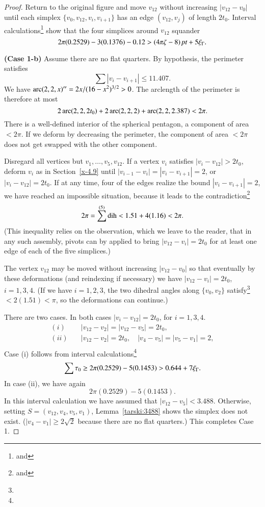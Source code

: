 \begin{proof}
Return to the original figure and move $v_{12}$ without increasing
$|v_{12}-v_0|$ until each simplex $\{v_0,v_{12},v_i,v_{i+1}\}$ has an edge
$(v_{12},v_j)$ of length $2t_0$. Interval
calculations\footnote{ and } show
that the four simplices around $v_{12}$ squander
    $$2\pi(0.2529)-3(0.1376)-0.12 > (4\pi\zeta-8)\,\hbox{\it pt} + 5\xi_\Gamma.$$

{\bf (Case 1-b)} Assume there are no flat quarters. By hypothesis,
the perimeter satisfies $$\sum|v_i-v_{i+1}|\le 11.407.$$ We have
$\operatorname{arc}(2,2,x)'' = 2x/(16-x^2)^{3/2} >0$. The arclength of the
perimeter is therefore at most
$$2\operatorname{arc}(2,2,2t_0) + 2\operatorname{arc}(2,2,2) + \operatorname{arc}(2,2,2.387) <  2\pi.$$
There is a well-defined interior of the spherical pentagon, a
component of area $<2\pi$.  If we deform by decreasing the
perimeter, the component of area $<2\pi$ does not get swapped with
the other component.

Disregard all vertices but $v_1,\ldots,v_5,v_{12}$.  If a vertex
$v_i$ satisfies  $|v_i-v_{12}|>2t_0$, deform $v_i$ as in
Section~\ref{x-4.9} until $|v_{i-1}-v_{i}|=|v_i-v_{i+1}|=2$, or
$|v_i-v_{12}|=2t_0$. If at any time, four of the edges realize the
bound $|v_i-v_{i+1}|=2$, we have reached an impossible situation,
because it leads to the contradiction\footnote{
and }
    $$2\pi = \sum^{(5)}\operatorname{dih} < 1.51 + 4 (1.16) < 2\pi.$$
(This inequality relies on the observation, which we leave to the
reader, that in any such assembly, pivots can by applied to bring
$|v_{12}-v_i|=2t_0$ for at least one edge of each of the five
simplices.)



The vertex $v_{12}$ may be moved without increasing $|v_{12}-v_0|$ so
that eventually by these deformations (and reindexing if
necessary) we have $|v_{12}-v_i|=2t_0$, $i=1,3,4$. (If we have
$i=1,2,3$, the two dihedral angles along $\{v_0,v_2\}$
satisfy\footnote{} $<2(1.51)<\pi$, so the
deformations can continue.)



There are two cases. In both cases $|v_i-v_{12}|=2t_0$, for
$i=1,3,4$.
$$
\begin{array}{lll}
(i)\quad &|v_{12}-v_2|=|v_{12}-v_5|=2t_0,\\
(ii)\quad &|v_{12}-v_2|=2t_0,\quad |v_4-v_5|=|v_5-v_1|=2,\\
\end{array}
$$
Case (i) follows from interval
calculations\footnote{}
$$
\sum\tau_0 \ge 2\pi(0.2529) - 5 (0.1453) > 0.644+7\xi_\Gamma.
$$
In case (ii), we have again
    $$2\pi(0.2529)-5 (0.1453).$$
In this interval calculation we have assumed that
$|v_{12}-v_5|<3.488$. Otherwise, setting $S=(v_{12},v_4,v_5,v_1)$, Lemma~\ref{tarski:3488}
shows the simplex does not exist.
($|v_4-v_1|\ge2\sqrt2$ because
there are no flat quarters.)
This completes Case 1.


\end{proof}
